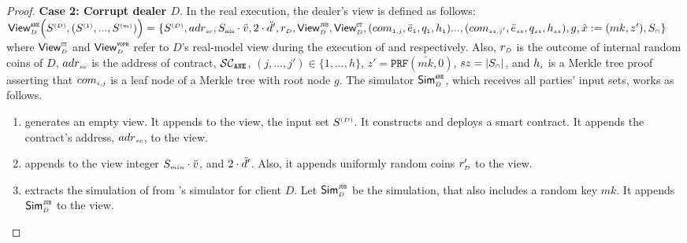 \begin{proof}
\noindent\textbf{Case 2: Corrupt dealer $D$}.  In the real execution, the dealer's view is defined as follows:  
%
$ \mathsf{View}_{\st D}^{\st \epsi} \Big(S^{\st (D)}, (S^{\st (1)},..., S^{\st (m)})\Big)=  \{S^{\st (D)}, adr_{\st sc}, S_{\minn}\cdot \vc, 2\cdot \dc', 
%
%
 r_{\st D},  \mathsf{View}^{\st \fpsi}_{\st D}, \mathsf{View}^{\st \ct}_{\st D},\\ (com_{\st 1,j}, \bar{e}_{\st 1}, q_{\st 1}, h_{\st 1})..., (com_{\st sz, j'}, \bar{e}_{\st sz}, q_{\st {sz}}, h_{\st sz}), g, \hat{x}:=({mk}, z'), 
  S_{\st \cap}\}$
%
where  $\mathsf{View}^{\scriptscriptstyle \mathtt{CT}}_{\scriptscriptstyle D}$ and $\mathsf{View}^{\scriptscriptstyle \mathtt{VOPR}}_{\scriptscriptstyle D}$ refer to $D$'s real-model view during the execution of \ct and \vopr respectively. Also, $r_{\scriptscriptstyle D}$ is the outcome of internal random coins of $D$, $adr_{\scriptscriptstyle sc}$ is the address of contract, $\mathcal{SC}_{\mathtt{ANE}}$, $(j, ...,j')\in \{1,..., h\}$, $z'=\mathtt{PRF}(\bar{mk}, 0)$, $sz=|S_{\scriptscriptstyle \cap}|$, and $h_{\scriptscriptstyle i}$ is a Merkle tree proof asserting that $com_{\scriptscriptstyle i,j}$ is a leaf node of a Merkle tree with root node $g$. The simulator $\mathsf{Sim}^{\scriptscriptstyle \mathtt{ANE}}_{\scriptscriptstyle D}$, which receives all parties' input sets, works as follows. 

\begin{enumerate}

%
\item generates an empty view. It appends to the view, the input set $S^{\scriptscriptstyle (D)}$. It constructs and deploys a smart contract. It appends the contract's address, $ {adr}_{\scriptscriptstyle sc}$, to the view. 


\item appends to the view integer $S_{\scriptscriptstyle min}\cdot \ddot{v}$, and $2\cdot \ddot{d}'$. Also, it appends uniformly random coins $r'_{\scriptscriptstyle D}$ to the view. 

%
\item extracts the simulation of \fpsi from \fpsi's simulator for client $D$. Let $\mathsf{Sim}^{\scriptscriptstyle \mathtt{JUS}}_{\scriptscriptstyle D}$ be the simulation, that also includes a random key $mk$. It appends $\mathsf{Sim}^{\scriptscriptstyle \mathtt{JUS}}_{\scriptscriptstyle D}$ to the view. 



\end{enumerate}
\end{proof}

